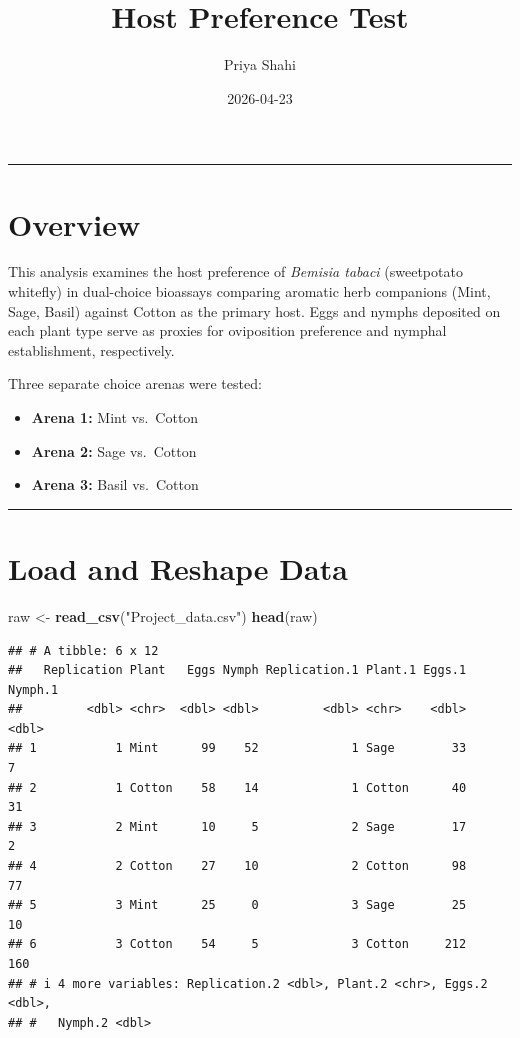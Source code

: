 \documentclass[
]{article}
\title{Host Preference Test}
\author{Priya Shahi}
\date{2026-04-23}
\newenvironment{Shaded}{\begin{snugshade}}{\end{snugshade}}
\newcommand{\FunctionTok}[1]{\textcolor[rgb]{0.13,0.29,0.53}{\textbf{#1}}}
\newcommand{\NormalTok}[1]{#1}
\newcommand{\OtherTok}[1]{\textcolor[rgb]{0.56,0.35,0.01}{#1}}
\newcommand{\StringTok}[1]{\textcolor[rgb]{0.31,0.60,0.02}{#1}}
\providecommand{\tightlist}{%
  \setlength{\itemsep}{0pt}\setlength{\parskip}{0pt}}
\begin{document}
\maketitle

\begin{center}\rule{0.5\linewidth}{0.5pt}\end{center}

\section{Overview}\label{overview}

This analysis examines the host preference of \emph{Bemisia tabaci}
(sweetpotato whitefly) in dual-choice bioassays comparing aromatic herb
companions (Mint, Sage, Basil) against Cotton as the primary host. Eggs
and nymphs deposited on each plant type serve as proxies for oviposition
preference and nymphal establishment, respectively.

Three separate choice arenas were tested:

\begin{itemize}
\tightlist
\item
  \textbf{Arena 1:} Mint vs.~Cotton\\
\item
  \textbf{Arena 2:} Sage vs.~Cotton\\
\item
  \textbf{Arena 3:} Basil vs.~Cotton
\end{itemize}

\begin{center}\rule{0.5\linewidth}{0.5pt}\end{center}

\section{Load and Reshape Data}\label{load-and-reshape-data}

\begin{Shaded}
\begin{Highlighting}[]
\NormalTok{raw }\OtherTok{\textless{}{-}} \FunctionTok{read\_csv}\NormalTok{(}\StringTok{"Project\_data.csv"}\NormalTok{)}
\FunctionTok{head}\NormalTok{(raw)}
\end{Highlighting}
\end{Shaded}

\begin{verbatim}
## # A tibble: 6 x 12
##   Replication Plant   Eggs Nymph Replication.1 Plant.1 Eggs.1 Nymph.1
##         <dbl> <chr>  <dbl> <dbl>         <dbl> <chr>    <dbl>   <dbl>
## 1           1 Mint      99    52             1 Sage        33       7
## 2           1 Cotton    58    14             1 Cotton      40      31
## 3           2 Mint      10     5             2 Sage        17       2
## 4           2 Cotton    27    10             2 Cotton      98      77
## 5           3 Mint      25     0             3 Sage        25      10
## 6           3 Cotton    54     5             3 Cotton     212     160
## # i 4 more variables: Replication.2 <dbl>, Plant.2 <chr>, Eggs.2 <dbl>,
## #   Nymph.2 <dbl>
\end{verbatim}
\end{document}
